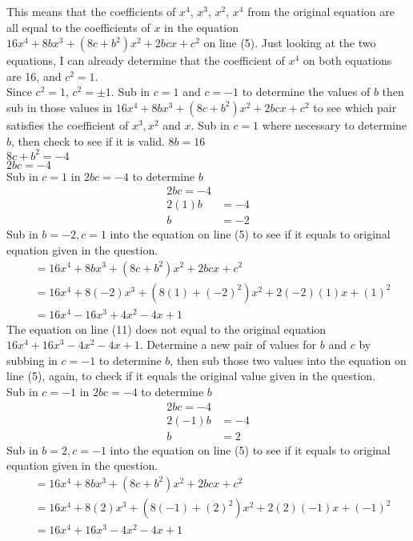 \documentclass[12pt]{book}
\begin{document}
\begin{enumerate}
\begin{enumerate}
This means that the coefficients of $x^4$, $x^3$, $x^2$, $x^4$ from the original equation are all equal to the coefficients of $x$ in the equation $16x^4 +8bx^3+ (8c+b^2)x^2+2bcx+c^2$ on line (5). Just looking at the two equations, I can already determine that the coefficient of $x^4$ on both equations are 16, and $c^2=1$.\\

Since $c^2 = 1$, $c^2 = \pm 1$. Sub in $c=1$ and $c=-1$ to determine the values of $b$ then sub in those values in $16x^4 +8bx^3+ (8c+b^2)x^2+2bcx+c^2$ to see which pair satisfies the coefficient of $x^3,x^2$ and $x$. Sub in $c = 1$ where necessary to determine $b$, then check to see if it is valid.
$8b = 16$ \\
$8c+b^2 = -4$ \\
$2bc = -4$ \\
Sub in $c=1$ in $2bc = -4$ to determine $b$
\begin{align}
    2bc = -4 \\
    2(1)b &= -4 \\
    b &= -2
\end{align}
Sub in $b=-2, c=1$ into the equation on line (5) to see if it equals to original equation given in the question.
\begin{align}
    &= 16x^4 +8bx^3+ (8c+b^2)x^2+2bcx+c^2 \\
    &= 16x^4 +8(-2)x^3+ (8(1)+(-2)^2)x^2 +2(-2)(1)x+(1)^2 \\
    &= 16x^4 - 16x^3 + 4x^2 - 4x+ 1
\end{align}
The equation on line (11) does not equal to the original equation $16x^4 + 16x^3 -4x^2 - 4x + 1$. Determine a new pair of values for $b$ and $c$ by subbing in $c=-1$ to determine $b$, then sub those two values into the equation on line (5), again, to check if it equals the original value given in the question.\\
Sub in $c=-1$ in $2bc = -4$ to determine $b$
\begin{align}
    2bc = -4 \\
    2(-1)b &= -4 \\
    b &= 2
\end{align}
Sub in $b=2, c=-1$ into the equation on line (5) to see if it equals to original equation given in the question.
\begin{align}
    &= 16x^4 +8bx^3+ (8c+b^2)x^2+2bcx+c^2 \\
    &= 16x^4 +8(2)x^3+ (8(-1)+(2)^2)x^2 +2(2)(-1)x+(-1)^2 \\
    &= 16x^4 + 16x^3 - 4x^2 - 4x+ 1

\end{align}
\end{enumerate}
\end{enumerate}
\end{document}
